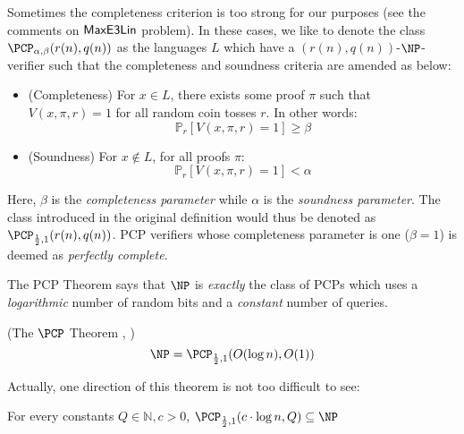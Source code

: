 \begin{remark}
  Sometimes the completeness criterion is too strong for our purposes (see the comments on $\mathsf{MaxE3Lin}$ problem). In these cases, we like to denote the class $\PCP_{\alpha, \beta }(r(n),q(n))$ as the languages $L$ which have a $(r(n),q(n))$-$\NP$-verifier such that the completeness and soundness criteria are amended as below: \newline

  \begin{itemize}
    \item (Completeness) For $x \in L$, there exists some proof $\pi$ such that $V(x,\pi,r) = 1$ for all random coin tosses $r$. In other words:
    \begin{equation}
      \mathbb{P}_{r}[V(x,\pi,r) = 1] \geq \beta
    \end{equation}

    \item (Soundness) For $x \not\in L$, for all proofs $\pi$:
    \begin{equation}
      \mathbb{P}_{r}[V(x,\pi,r) = 1] < \alpha
    \end{equation}
  \end{itemize}
Here, $\beta$ is the \emph{completeness parameter} while $\alpha$ is the \emph{soundness parameter}. The class introduced in the original definition would thus be denoted as $\PCP_{\frac{1}{2},1}(r(n),q(n))$. PCP verifiers whose completeness parameter is one ($\beta = 1$) is deemed as \emph{perfectly complete}.
\end{remark}

The PCP Theorem says that $\NP$ is \emph{exactly} the class of PCPs which uses a \emph{logarithmic} number of random bits and a \emph{constant} number of queries.
%
\begin{theorem} \label{pcptheorem} (The $\PCP$ Theorem \cite{arora1998proof}, \cite{arora1998probabilistic})
%
\begin{equation}
\NP = \PCP_{\frac{1}{2},1}(O(\log{n}), O(1))
\end{equation}
\end{theorem}

Actually, one direction of this theorem is not too difficult to see:

\begin{proposition}
For every constants $Q \in \mathbb{N}, c > 0$, $\PCP_{\frac{1}{2}, 1}(c\cdot\log{n}, Q) \subseteq \NP$
\end{proposition}

